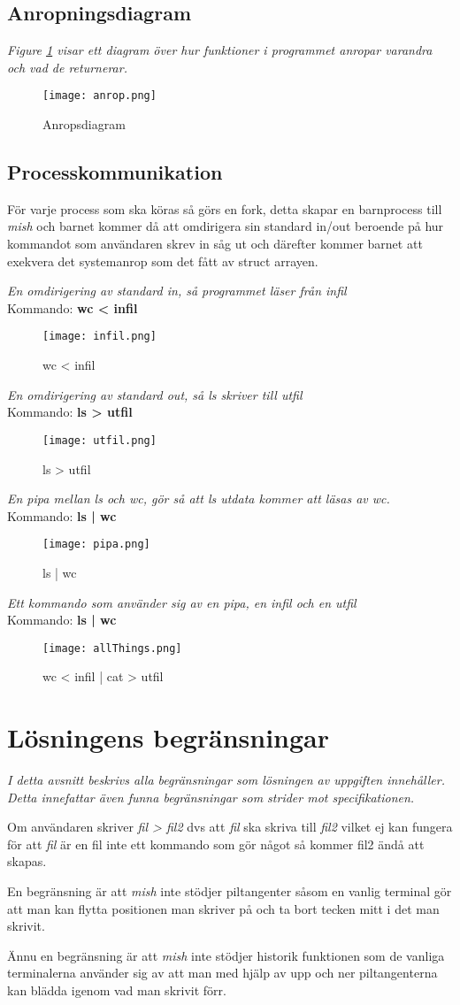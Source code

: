 \documentclass[11pt, titlepage, oneside, a4paper]{article}
\newcommand{\Section}[1]{\section{#1}\vspace{-8pt}}
\newcommand{\Subsection}[1]{\vspace{-4pt}\subsection{#1}\vspace{-8pt}}
\begin{document}
		\Subsection{Anropningsdiagram}
		\emph{Figure \ref{fig:anropa} visar ett diagram över hur funktioner i programmet anropar varandra och vad de returnerar.}
		
		\begin{figure}[h]
		\texttt{[image: anrop.png]}
		\caption{Anropsdiagram}
		\label{fig:anropa}
		 \end{figure}
		
		\newpage
		
		\Subsection{Processkommunikation}
		För varje process som ska köras så görs en fork, detta skapar en barnprocess till \emph{mish} och barnet kommer då att
		omdirigera sin standard in/out beroende på hur kommandot som användaren skrev in såg ut och därefter kommer barnet att exekvera
		det systemanrop som det fått av struct arrayen.
		
		
		\emph{En omdirigering av standard in, så programmet läser från infil}
		\\Kommando: \textbf{wc < infil}
		\begin{figure}[h]
		\texttt{[image: infil.png]}
		\caption{wc < infil}
		 \end{figure}	
		
		\emph{En omdirigering av standard out, så ls skriver till utfil}
		\\Kommando: \textbf{ls > utfil}
		\begin{figure}[h]
		\texttt{[image: utfil.png]}
		\caption{ls > utfil}
		 \end{figure}
		 
		 \emph{En pipa mellan ls och wc, gör så att ls utdata kommer att läsas av wc.}
		 \\Kommando: \textbf{ls | wc}
		 \begin{figure}[h]
		\texttt{[image: pipa.png]}
		\caption{ls | wc}
		 \end{figure}
		 
		  \emph{Ett kommando som använder sig av en pipa, en infil och en utfil}
		 \\Kommando: \textbf{ls | wc}
		 \begin{figure}[h]
		\texttt{[image: allThings.png]}
		\caption{wc < infil | cat > utfil}
		 \end{figure}

	\Section{Lösningens begränsningar}
		\emph{I detta avsnitt beskrivs alla begränsningar som lösningen av
			uppgiften innehåller. Detta innefattar även funna begränsningar
			som strider mot specifikationen.}
		
		Om användaren skriver \emph{fil > fil2} dvs att \emph{fil} ska skriva till \emph{fil2} vilket ej kan fungera för att \emph{fil} är en fil inte ett kommando som gör något så kommer 
		fil2 ändå att skapas.
		
		En begränsning är att \emph{mish} inte stödjer piltangenter såsom en vanlig terminal gör att man kan flytta positionen man skriver på och ta bort tecken mitt i det man skrivit.
	      
	      
		Ännu en begränsning är att \emph{mish} inte stödjer historik funktionen som de vanliga terminalerna använder sig av att man med hjälp av upp och ner piltangenterna kan blädda
		igenom vad man skrivit förr.
\end{document}
